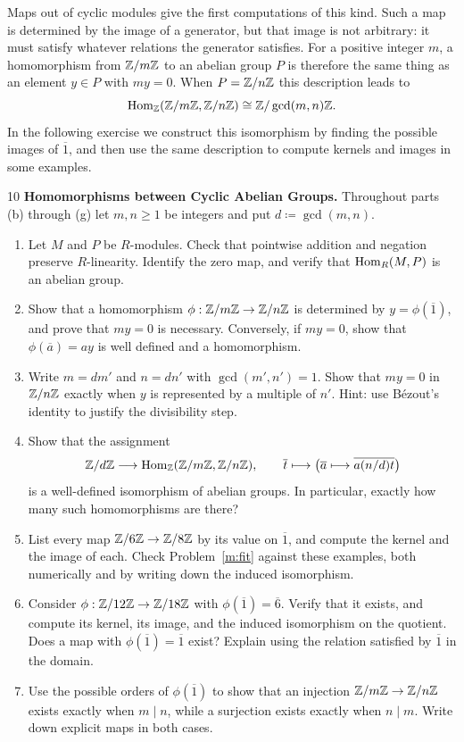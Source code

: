 \documentclass[Notebook.tex]{subfiles}
\begin{document}
Maps out of cyclic modules give the first computations of this kind. Such a map is determined by the image of a generator, but that image is not arbitrary: it must satisfy whatever relations the generator satisfies. For a positive integer $m$, a homomorphism from $\mathbb Z/m\mathbb Z$ to an abelian group $P$ is therefore the same thing as an element $y\in P$ with $my=0$. When $P=\mathbb Z/n\mathbb Z$ this description leads to
\[
\operatorname{Hom}_{\mathbb Z}(\mathbb Z/m\mathbb Z,\mathbb Z/n\mathbb Z)\cong\mathbb Z/\gcd(m,n)\mathbb Z.
\]
In the following exercise we construct this isomorphism by finding the possible images of $\overline1$, and then use the same description to compute kernels and images in some examples.

\hrulefill

\begin{problem}{10}\label{m:cyclic}
	\textbf{Homomorphisms between Cyclic Abelian Groups.} Throughout parts (b) through (g) let $m,n\geq1$ be integers and put $d\coloneqq\gcd(m,n)$.
	\begin{enumerate}[label=(\alph*),ref=\theenumi\alph*]
		\item Let $M$ and $P$ be $R$-modules. Check that pointwise addition and negation preserve $R$-linearity. Identify the zero map, and verify that $\operatorname{Hom}_R(M,P)$ is an abelian group.
		\item Show that a homomorphism $\phi:\mathbb Z/m\mathbb Z\to\mathbb Z/n\mathbb Z$ is determined by $y=\phi(\overline1)$, and prove that $my=0$ is necessary. Conversely, if $my=0$, show that $\phi(\overline a)=ay$ is well defined and a homomorphism.
		\item Write $m=dm'$ and $n=dn'$ with $\gcd(m',n')=1$. Show that $my=0$ in $\mathbb Z/n\mathbb Z$ exactly when $y$ is represented by a multiple of $n'$. Hint: use B\'ezout's identity to justify the divisibility step.
		\item Show that the assignment
		\[
		\mathbb Z/d\mathbb Z\longrightarrow\operatorname{Hom}_{\mathbb Z}(\mathbb Z/m\mathbb Z,\mathbb Z/n\mathbb Z),\qquad
		\overline t\longmapsto
		\bigl(\overline a\longmapsto\overline{a(n/d)t}\bigr)
		\]
		is a well-defined isomorphism of abelian groups. In particular, exactly how many such homomorphisms are there?
		\item List every map $\mathbb Z/6\mathbb Z\to\mathbb Z/8\mathbb Z$ by its value on $\overline1$, and compute the kernel and the image of each. Check Problem~\ref{m:fit} against these examples, both numerically and by writing down the induced isomorphism.
		\item Consider $\phi:\mathbb Z/12\mathbb Z\to\mathbb Z/18\mathbb Z$ with $\phi(\overline1)=\overline6$. Verify that it exists, and compute its kernel, its image, and the induced isomorphism on the quotient. Does a map with $\phi(\overline1)=\overline1$ exist? Explain using the relation satisfied by $\overline1$ in the domain.
		\item Use the possible orders of $\phi(\overline1)$ to show that an injection $\mathbb Z/m\mathbb Z\to\mathbb Z/n\mathbb Z$ exists exactly when $m\mid n$, while a surjection exists exactly when $n\mid m$. Write down explicit maps in both cases.
	\end{enumerate}
\end{problem}
\end{document}
